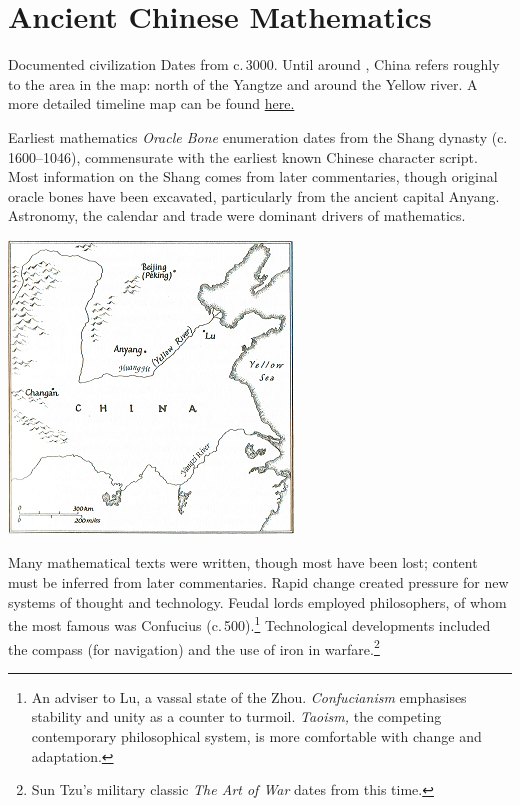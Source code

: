 \graphicspath{{5china/pics/}}

\section{Ancient Chinese Mathematics}

\begin{description}\itemsep2pt
	\begin{minipage}[t]{0.62\linewidth}\vspace{-10pt}
	  \item[Documented civilization] Dates from c.\,3000\BC. Until around , China refers roughly to the area in the map: north of the Yangtze and around the Yellow river. A more detailed timeline map can be found \href{https://timemaps.com/history/china-200bc/}{here.}\vspace{2pt}
	  
	  \item[Earliest mathematics] \emph{Oracle Bone} enumeration dates from the Shang dynasty (c.\,1600--1046\BC), commensurate with the earliest known Chinese character script. Most information on the Shang comes from later commentaries, though original oracle bones have been excavated, particularly from the ancient capital Anyang. Astronomy, the calendar and trade were dominant drivers of mathematics.
	\end{minipage}
	\hfill
	\begin{minipage}[t]{0.37\linewidth}\vspace{-20pt}
		\flushright\includegraphics[scale=0.73]{AncientChina-small.png}
	\end{minipage}

  \item[Zhou dynasty (1046--256\BC) and the Warring States period (475--221\BC)] Many mathematical texts were written, though most have been lost; content must be inferred from later commentaries. Rapid change created pressure for new systems of thought and technology. Feudal lords employed philosophers, of whom the most famous was Confucius (c.\,500\BC).\footnote{An adviser to Lu, a vassal state of the Zhou. \emph{Confucianism} emphasises stability and unity as a counter to turmoil. \emph{Taoism,} the competing contemporary philosophical system, is more comfortable with change and adaptation.} Technological developments included the compass (for navigation) and the use of iron in warfare.\footnote{Sun Tzu's military classic \emph{The Art of War} dates from this time.}
  

\end{description}
